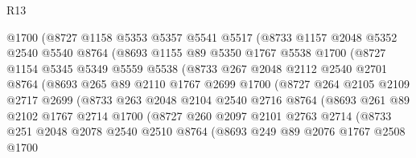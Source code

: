 \begin{lexlean}{R13}
\begin{coremodule}
              @1700
              (@8727
                @1158
                @5353
                @5357
                @5541
                @5517
                (@8733
                  @1157
                  @2048
                  @5352
                  @2540
                  @5540
                  @8764
                  (@8693
                    @1155
                    @89
                    @5350
                    @1767
                    @5538
                    @1700
                    (@8727
                      @1154
                      @5345
                      @5349
                      @5559
                      @5538
                      (@8733
                        @267
                        @2048
                        @2112
                        @2540
                        @2701
                        @8764
                        (@8693
                          @265
                          @89
                          @2110
                          @1767
                          @2699
                          @1700
                          (@8727
                            @264
                            @2105
                            @2109
                            @2717
                            @2699
                            (@8733
                              @263
                              @2048
                              @2104
                              @2540
                              @2716
                              @8764
                              (@8693
                                @261
                                @89
                                @2102
                                @1767
                                @2714
                                @1700
                                (@8727
                                  @260
                                  @2097
                                  @2101
                                  @2763
                                  @2714
                                  (@8733
                                    @251
                                    @2048
                                    @2078
                                    @2540
                                    @2510
                                    @8764
                                    (@8693
                                      @249
                                      @89
                                      @2076
                                      @1767
                                      @2508
                                      @1700

\end{coremodule}
\end{lexlean}
